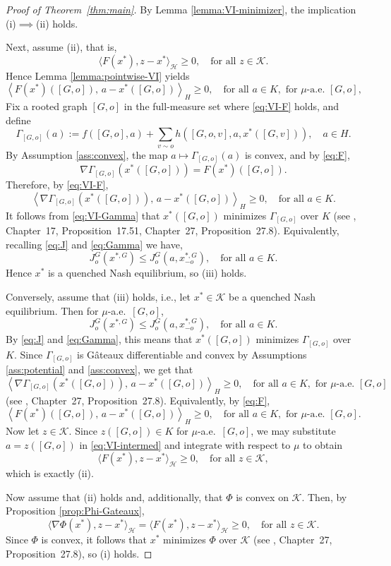 \documentclass[11pt]{article}
\newcommand{\be}{\begin{equation}}
\newcommand{\ee}{\end{equation}}
\numberwithin{equation}{section}
\begin{document}
\begin{proof}[Proof of Theorem~\ref{thm:main}]
By Lemma \ref{lemma:VI-minimizer}, the implication (i)$\implies$(ii) holds. 

Next, assume (ii), that is,
\[
\langle F(x^\ast),z-x^\ast\rangle_{\mathcal H}\ge 0,
\quad \text{for all } z\in\mathcal K.
\]
Hence Lemma \ref{lemma:pointwise-VI} yields
\be\label{eq:VI-F}
\left\langle
F(x^\ast)([G,o]),\, a-x^\ast([G,o])
\right\rangle_H
\ge 0,
\quad \text{for all } a\in K, \text{ for } \mu\text{-a.e. } [G,o],
\ee
Fix a rooted graph \([G,o]\) in the full-measure set where \eqref{eq:VI-F} holds, and define
\be\label{eq:Gamma}
\Gamma_{[G,o]}(a)
:=
f([G,o],a)+\sum_{v\sim o} h([G,o,v],a,x^\ast([G,v])),
\quad a\in H.
\ee
By Assumption \ref{ass:convex}, the map \(a\mapsto \Gamma_{[G,o]}(a)\) is convex, and by \eqref{eq:F},
\[
\nabla \Gamma_{[G,o]}(x^\ast([G,o]))=F(x^\ast)([G,o]).
\]
Therefore, by \eqref{eq:VI-F},
\be\label{eq:VI-Gamma}
\left\langle
\nabla \Gamma_{[G,o]}(x^\ast([G,o])),\, a-x^\ast([G,o])
\right\rangle_H\ge 0,
\quad \text{for all } a\in K.
\ee
It follows from \eqref{eq:VI-Gamma} that \(x^\ast([G,o])\) minimizes \(\Gamma_{[G,o]}\) over \(K\) (see \cite{bauschke2017}, Chapter~17, Proposition~17.51, Chapter~27, Proposition~27.8). Equivalently, recalling \eqref{eq:J} and \eqref{eq:Gamma} we have, 
\[
J_o^G(x^{\ast,G})\le J_o^G(a,x^{\ast,G}_{-o}),
\quad \text{for all } a\in K.
\]
Hence \(x^\ast\) is a quenched Nash equilibrium, so (iii) holds.

Conversely, assume that (iii) holds, i.e., let \(x^\ast\in\mathcal K\) be a quenched Nash equilibrium. Then for \(\mu\)-a.e.~\([G,o]\),
\[
J_o^G(x^{\ast,G})\le J_o^G(a,x^{\ast,G}_{-o}),
\quad \text{for all } a\in K.
\]
By \eqref{eq:J} and \eqref{eq:Gamma},
this means that \(x^\ast([G,o])\) minimizes \(\Gamma_{[G,o]}\) over \(K\). Since \(\Gamma_{[G,o]}\) is G\^ateaux differentiable and convex by Assumptions \ref{ass:potential} and \ref{ass:convex}, we get that
\[
\left\langle
\nabla \Gamma_{[G,o]}(x^\ast([G,o])),\, a-x^\ast([G,o])
\right\rangle_H\ge 0,
\quad \text{for all } a\in K, \text{ for } \mu\text{-a.e. } [G,o]
\]
(see \cite{bauschke2017}, Chapter~27, Proposition~27.8). Equivalently, by \eqref{eq:F},
\be\label{eq:VI-intermed}
\left\langle
F(x^\ast)([G,o]),\, a-x^\ast([G,o])
\right\rangle_H\ge 0,
\quad \text{for all } a\in K, \text{ for } \mu\text{-a.e. } [G,o].
\ee
Now let \(z\in\mathcal K\). Since \(z([G,o])\in K\) for \(\mu\)-a.e.~\([G,o]\), we may substitute \(a=z([G,o])\) in \eqref{eq:VI-intermed} and integrate with respect to $\mu$ to obtain
\[
\langle F(x^\ast),z-x^\ast\rangle_{\mathcal H}\ge 0,
\quad \text{for all } z\in\mathcal K,
\]
which is exactly (ii). 

Now assume that (ii) holds and, additionally, that \(\Phi\) is convex on \(\mathcal K\). Then, by Proposition \ref{prop:Phi-Gateaux},
\[
\langle \nabla\Phi(x^\ast),z-x^\ast\rangle_{\mathcal H}
=
\langle F(x^\ast),z-x^\ast\rangle_{\mathcal H}\ge 0,
\quad \text{for all } z\in\mathcal K.
\]
Since \(\Phi\) is convex, it follows that \(x^\ast\) minimizes \(\Phi\) over \(\mathcal K\) (see \cite{bauschke2017}, Chapter~27, Proposition~27.8), so (i) holds.
\end{proof}
\end{document}
